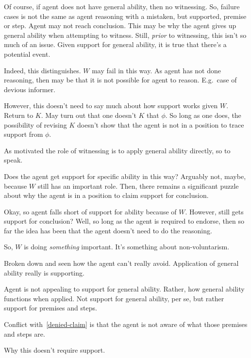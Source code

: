 \begin{note}[\(\geop{2}\)]
  Of course, if agent does not have general ability, then no witnessing.
  So, failure cases is not the same as agent reasoning with a mistaken, but supported, premise or step.
  Agent may not reach conclusion.
  This may be why the agent gives up general ability when attempting to witness.
  Still, \emph{prior} to witnessing, this isn't so much of an issue.
  Given support for general ability, it is true that there's a potential event.

  Indeed, this distinguishes.
  \(W\) may fail in this way.
  As agent has not done reasoning, then may be that it is not possible for agent to reason.
  E.g.\ case of devious informer.

  However, this doesn't need to say much about how support works given \(W\).
  Return to \(K\).
  May turn out that one doesn't \(K\) that \(\phi\).
  So long as one does, the possibility of revising \(K\) doesn't show that the agent is not in a position to trace support from \(\phi\).

  {\color{red} As motivated} the role of witnessing is to apply general ability directly, so to speak.

  {
    \color{green}
    Does the agent get support for specific ability in this way?
    Arguably not, maybe, because \(W\) still has an important role.
    Then, there remains a significant puzzle about why the agent is in a position to claim support for conclusion.

    Okay, so agent falls short of support for ability because of \(W\).
    However, still gets support for conclusion?
    Well, so long as the agent is required to endorse, then so far the idea has been that the agent doesn't need to do the reasoning.

    So, \(W\) is doing \emph{something} important.
    It's something about non-voluntarism.

    Broken down and seen how the agent can't really avoid.
    Application of general ability really is supporting.
  }




  Agent is not appealing to support for general ability.
  Rather, how general ability functions when applied.
  Not support for general ability, per se, but rather support for premises and steps.

  Conflict with~\ref{denied-claim} is that the agent is not aware of what those premises and steps are.




  Why this doesn't require support.


\end{note}
